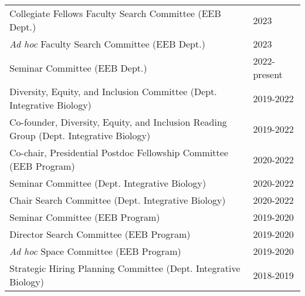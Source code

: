 \documentclass{article}
\begin{document}
\begin{longtable}{>{\everypar{\dohang}\dohang\raggedright\arraybackslash}p{}p{}}
%
Collegiate Fellows Faculty Search Committee (EEB Dept.) & \hfill 2023\\
%
\emph{Ad hoc} Faculty Search Committee (EEB Dept.) & \hfill 2023\\
%
Seminar Committee (EEB Dept.)  & \hfill 2022-present\\
%
Diversity, Equity, and Inclusion Committee (Dept. Integrative Biology) & \hfill 2019-2022\\
%
Co-founder, Diversity, Equity, and Inclusion Reading Group (Dept. Integrative Biology) & \hfill 2019-2022\\
%
Co-chair, Presidential Postdoc Fellowship Committee (EEB Program) & \hfill 2020-2022\\
%
Seminar Committee (Dept. Integrative Biology) & \hfill 2020-2022\\
%
Chair Search Committee (Dept. Integrative Biology) & \hfill 2020-2022\\
%
Seminar Committee (EEB Program) & \hfill 2019-2020\\
%
Director Search Committee (EEB Program) & \hfill 2019-2020\\
%
\emph{Ad hoc} Space Committee (EEB Program) & \hfill 2019-2020\\
%
Strategic Hiring Planning Committee (Dept. Integrative Biology) & \hfill 2018-2019\\
%
%
%
%
%
%
%
\end{longtable}
%
%
\end{document}
